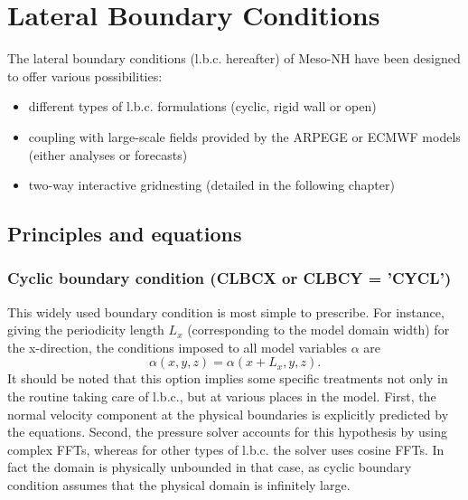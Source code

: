 
\chapter{Lateral Boundary Conditions}
\label{LateralBoundCond}

\minitoc

The lateral boundary conditions (l.b.c. hereafter) of Meso-NH
have been designed to offer various possibilities:

\begin{itemize}
\item different types of l.b.c. formulations (cyclic, rigid wall or open)
\item coupling with large-scale fields provided by the ARPEGE or ECMWF models
 (either analyses or forecasts)
\item two-way interactive gridnesting (detailed in the following chapter)
\end{itemize}

\section{Principles and equations}

\subsection{Cyclic boundary condition (CLBCX or CLBCY = 'CYCL')}

This widely used boundary condition is most simple to prescribe. For instance,
giving the periodicity length $L_x$ (corresponding to the
model domain width) for the x-direction, the conditions imposed to all
model variables $\alpha $ are
\begin{equation}
\alpha (x,y,z) = \alpha (x+L_x,y,z) \label{perlbc}.
\end{equation}
It should be noted that this option implies some specific treatments not only
in the routine taking care of l.b.c., but at various places in the model.
First, the normal velocity component at the physical boundaries is explicitly
predicted by the equations.
Second, the pressure solver accounts for this hypothesis by using complex
FFTs, whereas for other types of l.b.c. the solver uses cosine FFTs.
 In fact the domain is physically unbounded in that case, as cyclic
boundary condition assumes that the physical domain is infinitely large.

